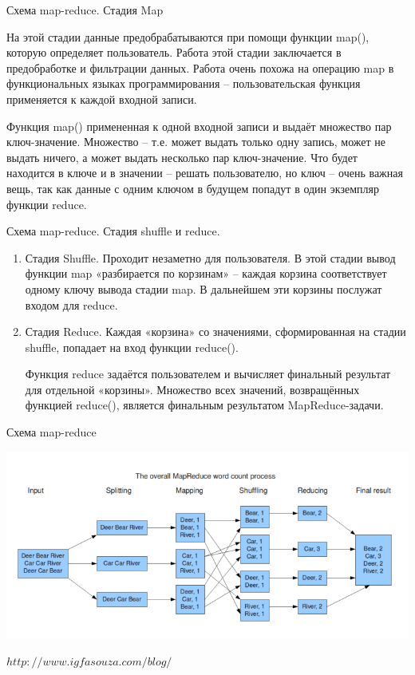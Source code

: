 \documentclass{beamer}
\begin{document}
\begin{frame}{Схема map-reduce. Стадия Map} 

    На этой стадии данные предобрабатываются при помощи функции map(), которую определяет пользователь. Работа этой стадии заключается в предобработке и фильтрации данных. Работа очень похожа на операцию map в функциональных языках программирования – пользовательская функция применяется к каждой входной записи.

Функция map() примененная к одной входной записи и выдаёт множество пар ключ-значение. Множество – т.е. может выдать только одну запись, может не выдать ничего, а может выдать несколько пар ключ-значение. Что будет находится в ключе и в значении – решать пользователю, но ключ – очень важная вещь, так как данные с одним ключом в будущем попадут в один экземпляр функции reduce.

\end{frame}

\begin{frame}{Схема map-reduce. Стадия shuffle и  reduce.} 


\begin{enumerate}

\item   Стадия Shuffle. Проходит незаметно для пользователя. В этой стадии вывод функции map «разбирается по корзинам» – каждая корзина соответствует одному ключу вывода 
стадии map. В дальнейшем эти корзины послужат входом для reduce.


\item   Стадия Reduce. Каждая «корзина» со значениями, сформированная на стадии shuffle, попадает на вход функции reduce().

Функция reduce задаётся пользователем и вычисляет финальный результат для отдельной «корзины».
Множество всех значений, возвращённых функцией reduce(), является финальным результатом MapReduce-задачи. 

\end{enumerate}

\end{frame}

\begin{frame}{Схема map-reduce}

\includegraphics[scale=0.4]{ris_01.png}

$http://www.igfasouza.com/blog/$

\end{frame}
\end{document}
